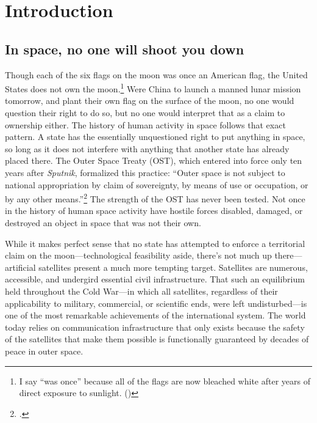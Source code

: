 \documentclass{report}
\begin{document}
\section{Introduction}
\subsection{In space, no one will shoot you down}
Though each of the six flags on the moon was once an American flag, the United States does not own the moon.\footnote{I say ``was once'' because all of the flags are now bleached white after years of direct exposure to sunlight. (\cite{spudis_faded_2011})} Were China to launch a manned lunar mission tomorrow, and plant their own flag on the surface of the moon, no one would question their right to do so, but no one would interpret that as a claim to ownership either. The history of human activity in space follows that exact pattern. A state has the essentially unquestioned right to put anything in space, so long as it does not interfere with anything that another state has already placed there. The Outer Space Treaty (OST), which entered into force only ten years after \emph{Sputnik}, formalized this practice: ``Outer space \textelp{} is not subject to national appropriation by claim of sovereignty, by means of use or occupation, or by any other means.''\footcite{noauthor_outer_1966} The strength of the OST has never been tested. Not once in the history of human space activity have hostile forces disabled, damaged, or destroyed an object in space that was not their own.

While it makes perfect sense that no state has attempted to enforce a territorial claim on the moon---technological feasibility aside, there's not much up there---artificial satellites present a much more tempting target. Satellites are numerous, accessible, and undergird essential civil infrastructure. That such an equilibrium held throughout the Cold War---in which all satellites, regardless of their applicability to military, commercial, or scientific ends, were left undisturbed---is one of the most remarkable achievements of the international system. The world today relies on communication infrastructure that only exists because the safety of the satellites that make them possible is functionally guaranteed by decades of peace in outer space.
\end{document}
